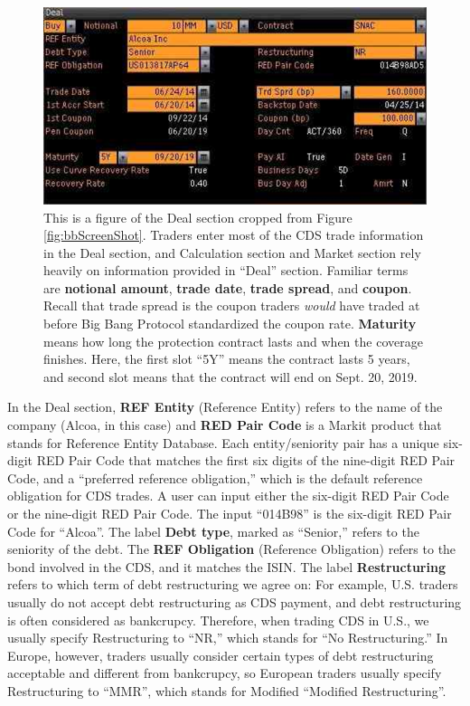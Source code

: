 \documentclass{jss}
\begin{document}
\begin{figure}[H]
\centering
\includegraphics{images/AlcoaIncCDSDeal.jpg}
\caption{\label{fig:bbDealSection}This is a figure of the Deal section cropped from Figure \ref{fig:bbScreenShot}. Traders enter most of the CDS trade information in the Deal section, and Calculation section and Market section rely heavily on information provided in ``Deal'' section. Familiar terms are \textbf{notional amount}, \textbf{trade date}, \textbf{trade spread}, and \textbf{coupon}. Recall that trade spread is the coupon traders \textit{would} have traded at before Big Bang Protocol standardized the coupon rate. \textbf{Maturity} means how long the protection contract lasts and when the coverage finishes. Here, the first slot ``5Y'' means the contract lasts 5 years, and second slot means that the contract will end on Sept. 20, 2019.}
\label{deal}
\end{figure}

In the Deal section, \textbf{REF Entity} (Reference Entity) refers to the name of the company (Alcoa, in this case) and \textbf{RED Pair Code} is a Markit product that stands for Reference Entity Database. Each entity/seniority pair has a unique six-digit RED Pair Code that matches the first six digits of the nine-digit RED Pair Code, and a ``preferred reference obligation,'' which is the default reference obligation for CDS  trades. A user can input either the six-digit RED Pair Code or the nine-digit RED Pair Code. The input ``014B98'' is the six-digit RED Pair Code for ``Alcoa''. The label \textbf{Debt type}, marked as ``Senior,'' refers to the seniority of the debt. The \textbf{REF Obligation} (Reference Obligation) refers to the bond involved in the CDS, and it matches the ISIN. The label \textbf{Restructuring} refers to which term of debt restructuring we agree on: For example, U.S. traders usually do not accept debt restructuring as CDS payment, and debt restructuring is often considered as bankcrupcy. Therefore, when trading CDS in U.S., we usually specify Restructuring to ``NR,'' which stands for ``No Restructuring.'' In Europe, however, traders usually consider certain types of debt restructuring acceptable and different from bankcrupcy, so European traders usually specify Restructuring to ``MMR'', which stands for Modified ``Modified Restructuring''. 
\end{document}
